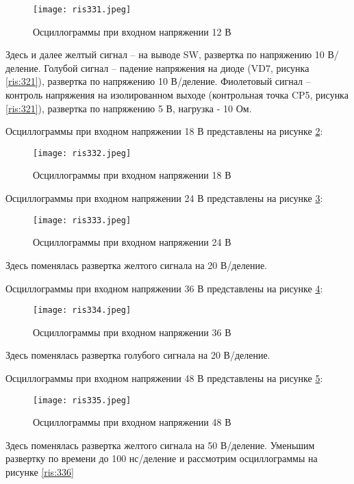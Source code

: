 \begin{figure}[H]
    \centering
    \texttt{[image: ris331.jpeg]}
    \caption{Осциллограммы при входном напряжении 12 В}
    \label{ris:331}
\end{figure}

Здесь и далее желтый сигнал -- на выводе SW, развертка по напряжению 10 В/деление. Голубой сигнал -- падение 
напряжения на диоде (VD7, рисунка \ref{ris:321}), развертка по напряжению 10 В/деление. Фиолетовый сигнал -- 
контроль напряжения на изолированном выходе (контрольная точка CP5, рисунка \ref{ris:321}), развертка
по напряжению 5 В, нагрузка - 10 Ом. 

Осциллограммы при входном напряжении 18 В представлены на рисунке \ref{ris:332}:

\begin{figure}[H]
    \centering
    \texttt{[image: ris332.jpeg]}
    \caption{Осциллограммы при входном напряжении 18 В}
    \label{ris:332}
\end{figure}

Осциллограммы при входном напряжении 24 В представлены на рисунке \ref{ris:333}:

\begin{figure}[H]
    \centering
    \texttt{[image: ris333.jpeg]}
    \caption{Осциллограммы при входном напряжении 24 В}
    \label{ris:333}
\end{figure}

Здесь поменялась развертка желтого сигнала на 20 В/деление. 

Осциллограммы при входном напряжении 36 В представлены на рисунке \ref{ris:334}:

\begin{figure}[H]
    \centering
    \texttt{[image: ris334.jpeg]}
    \caption{Осциллограммы при входном напряжении 36 В}
    \label{ris:334}
\end{figure}

Здесь поменялась развертка голубого сигнала на 20 В/деление. 

Осциллограммы при входном напряжении 48 В представлены на рисунке \ref{ris:335}:

\begin{figure}[H]
    \centering
    \texttt{[image: ris335.jpeg]}
    \caption{Осциллограммы при входном напряжении 48 В}
    \label{ris:335}
\end{figure}

Здесь поменялась развертка желтого сигнала на 50 В/деление. Уменьшим развертку по времени до 100 нс/деление
и рассмотрим осциллограммы на рисунке \ref{ris:336}


